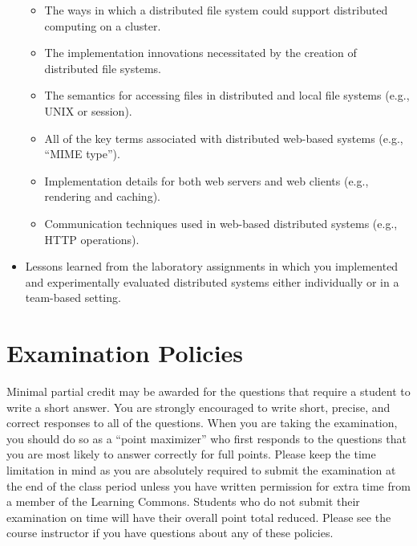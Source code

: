 \begin{itemize}[leftmargin=0.25in]
\begin{itemize}[leftmargin=0in]
      \item The ways in which a distributed file system could support distributed computing on a cluster.

      \item The implementation innovations necessitated by the creation of distributed file systems.

      \item The semantics for accessing files in distributed and local file systems (e.g., UNIX or session).

      \item All of the key terms associated with distributed web-based systems (e.g., ``MIME type'').

      \item Implementation details for both web servers and web clients (e.g., rendering and caching).

      \item Communication techniques used in web-based distributed systems (e.g., HTTP operations).

    \end{itemize}

  \item Lessons learned from the laboratory assignments in which you implemented and experimentally evaluated
    distributed systems either individually or in a team-based setting.


\end{itemize}

\vspace*{-.05in}
\section*{Examination Policies}

\vspace*{-.05in}
\noindent Minimal partial credit may be awarded for the questions that require a student to write a short answer. You
are strongly encouraged to write short, precise, and correct responses to all of the questions. When you are taking the
examination, you should do so as a ``point maximizer'' who first responds to the questions that you are most likely to
answer correctly for full points. Please keep the time limitation in mind as you are absolutely required to submit the
examination at the end of the class period unless you have written permission for extra time from a member of the
Learning Commons. Students who do not submit their examination on time will have their overall point total reduced.
Please see the course instructor if you have questions about any of these policies.

